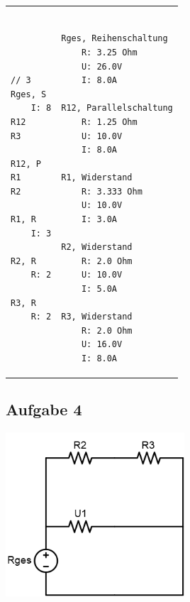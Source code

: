 \documentclass[a4paper,10pt,ngerman]{scrartcl}
\begin{document}
\begin{tabular}{p{}p{}}
\raggedright
\begin{verbatim}

// 3
Rges, S
    I: 8
R12
R3

R12, P
R1
R2

R1, R
    I: 3

R2, R
    R: 2

R3, R
    R: 2

\end{verbatim}   &
\raggedleft
\begin{verbatim}

Rges, Reihenschaltung
    R: 3.25 Ohm
    U: 26.0V
    I: 8.0A

R12, Parallelschaltung
    R: 1.25 Ohm
    U: 10.0V
    I: 8.0A

R1, Widerstand
    R: 3.333 Ohm
    U: 10.0V
    I: 3.0A

R2, Widerstand
    R: 2.0 Ohm
    U: 10.0V
    I: 5.0A

R3, Widerstand
    R: 2.0 Ohm
    U: 16.0V
    I: 8.0A

\end{verbatim}
\end{tabular}

\subsection{Aufgabe 4}

\includegraphics[width=0.5\textwidth]{circuit6.png}
\end{document}
